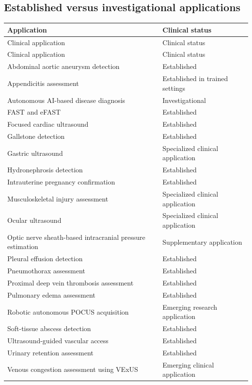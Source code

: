\subsection{Established versus investigational applications}
\begin{longtable}{@{}p{}p{}@{}}
\toprule
\textbf{Application} & \textbf{Clinical status} \\
\midrule
Clinical application & Clinical status \\
Clinical application & Clinical status \\
Abdominal aortic aneurysm detection & Established \\
Appendicitis assessment & Established in trained settings \\
Autonomous AI-based disease diagnosis & Investigational \\
FAST and eFAST & Established \\
Focused cardiac ultrasound & Established \\
Gallstone detection & Established \\
Gastric ultrasound & Specialized clinical application \\
Hydronephrosis detection & Established \\
Intrauterine pregnancy confirmation & Established \\
Musculoskeletal injury assessment & Specialized clinical application \\
Ocular ultrasound & Specialized clinical application \\
Optic nerve sheath-based intracranial pressure estimation & Supplementary application \\
Pleural effusion detection & Established \\
Pneumothorax assessment & Established \\
Proximal deep vein thrombosis assessment & Established \\
Pulmonary edema assessment & Established \\
Robotic autonomous POCUS acquisition & Emerging research application \\
Soft-tissue abscess detection & Established \\
Ultrasound-guided vascular access & Established \\
Urinary retention assessment & Established \\
Venous congestion assessment using VExUS & Emerging clinical application \\
\bottomrule
\end{longtable}

